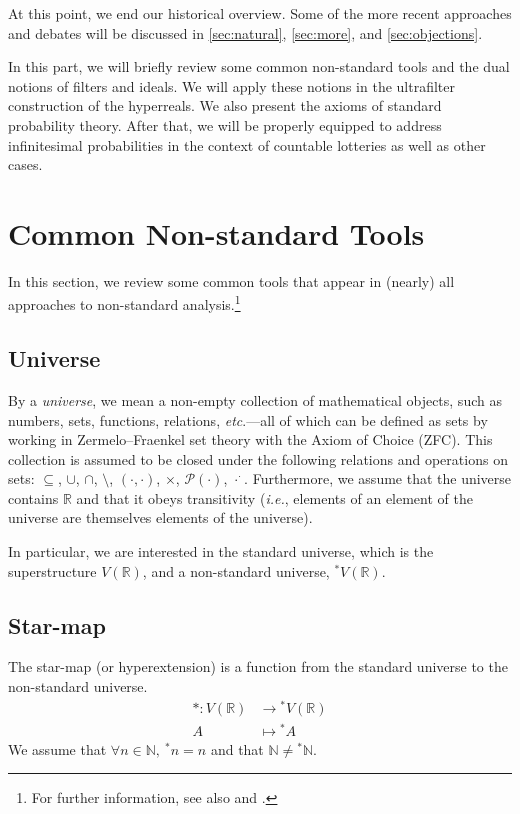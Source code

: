 At this point, we end our historical overview. Some of the more recent approaches and debates will be discussed in \autoref{sec:natural}, \autoref{sec:more}, and \autoref{sec:objections}.

\newpage
{}
In this part, we will briefly review some common non-standard tools and the dual notions of filters and ideals. We will apply these notions in the ultrafilter construction of the hyperreals. We also present the axioms of standard probability theory. After that, we will be properly equipped to address infinitesimal probabilities in the context of countable lotteries as well as other cases.

\section{Common Non-standard Tools}\label{sec:commonNStools}

In this section, we review some common tools that appear in (nearly) all approaches to non-standard analysis.\footnote{For further information, see also \citet[section~1]{Benci_etal:2006a} and \citet[section~1.2]{Cutland:1983}.}

\subsection{Universe}
By a \textit{universe}, we mean a non-empty collection of mathematical objects, such as numbers, sets, functions, relations, \textit{etc}.---all of which can be defined as sets by working in Zermelo--Fraenkel set theory with the Axiom of Choice (ZFC). This collection is assumed to be closed under the following relations and operations on sets: $\subseteq$, $\cup$, $\cap$, $\setminus$, $(\cdot,\cdot)$, $\times$, $\mathcal{P}(\cdot)$, $\cdot^\cdot$.
Furthermore, we assume that the universe contains $\mathbb{R}$ and that it obeys transitivity (\textit{i.e.}, elements of an element of the universe are themselves elements of the universe).

In particular, we are interested in the standard universe, which is the superstructure $V(\mathbb{R})$, and a non-standard universe, ${^\ast V}(\mathbb{R})$.

\subsection{Star-map}
The star-map (or hyperextension) is a function from the standard universe to the non-standard universe.
$$
\begin{aligned}
\ast : V(\mathbb{R}) &\rightarrow {^\ast V}(\mathbb{R})\\
	    A &\mapsto {^\ast A}
\end{aligned}
$$
We assume that $\forall n \in \mathbb{N}, \ {^\ast n}=n$ and that $\mathbb{N} \neq {^\ast \mathbb{N}}$.

